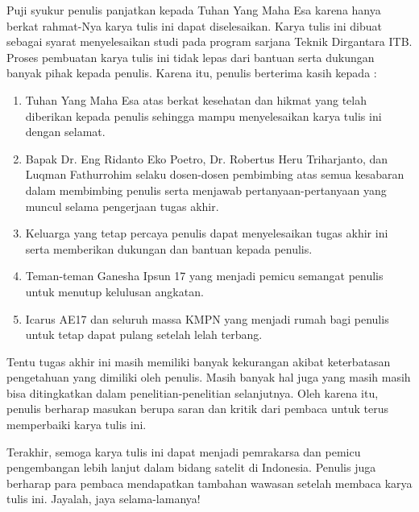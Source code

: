 Puji syukur penulis panjatkan kepada Tuhan Yang Maha Esa karena hanya berkat
rahmat-Nya karya tulis ini dapat diselesaikan. Karya tulis ini dibuat sebagai
syarat menyelesaikan studi pada program sarjana Teknik Dirgantara ITB. Proses
pembuatan karya tulis ini tidak lepas dari bantuan serta dukungan banyak pihak
kepada penulis. Karena itu, penulis berterima kasih kepada :

\begin{enumerate}
\item Tuhan Yang Maha Esa atas berkat kesehatan dan hikmat yang telah diberikan kepada penulis sehingga mampu menyelesaikan karya tulis ini dengan selamat.
\item Bapak Dr. Eng Ridanto Eko Poetro, Dr. Robertus Heru Triharjanto, dan Luqman Fathurrohim selaku dosen-dosen pembimbing atas semua kesabaran dalam membimbing penulis serta menjawab pertanyaan-pertanyaan yang muncul selama pengerjaan tugas akhir.
\item Keluarga yang tetap percaya penulis dapat menyelesaikan tugas akhir ini serta memberikan dukungan dan bantuan kepada penulis.
\item Teman-teman Ganesha Ipsun 17 yang menjadi pemicu semangat penulis untuk menutup kelulusan angkatan. 
\item Icarus AE17 dan seluruh massa KMPN yang menjadi rumah bagi penulis untuk tetap dapat pulang setelah lelah terbang.
\end{enumerate}

Tentu tugas akhir ini masih memiliki banyak kekurangan akibat keterbatasan
pengetahuan yang dimiliki oleh penulis. Masih banyak hal juga yang masih masih
bisa ditingkatkan dalam penelitian-penelitian selanjutnya. Oleh karena itu,
penulis berharap masukan berupa saran dan kritik dari pembaca untuk terus
memperbaiki karya tulis ini.

Terakhir, semoga karya tulis ini dapat menjadi pemrakarsa dan pemicu
pengembangan lebih lanjut dalam bidang satelit di Indonesia. Penulis juga
berharap para pembaca mendapatkan tambahan wawasan setelah membaca karya tulis
ini. Jayalah, jaya selama-lamanya!

